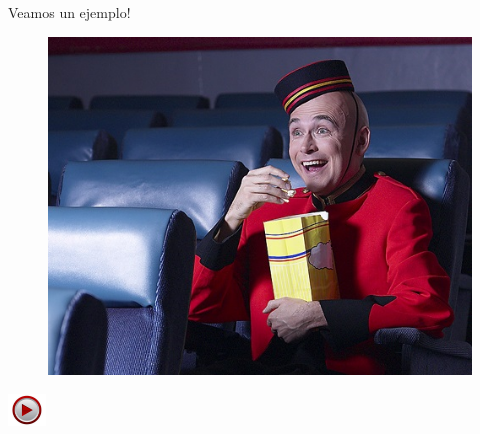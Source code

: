 \documentclass[]{beamer}
\newcommand{\video}[1]{
    \begin{center}
        \href{run:#1}{
            \includegraphics[width=1cm]{img/play.jpeg}
        }
    \end{center}
}
\begin{document}
\begin{frame}[t]{Veamos un ejemplo!}
    \begin{figure}[t]
        \centering
        \includegraphics[scale=0.5]{img/pochoclos/comiendo_1.jpg}
    \end{figure}
    \video{videos/seguimiento_rgb.avi}
\end{frame}
\end{document}
